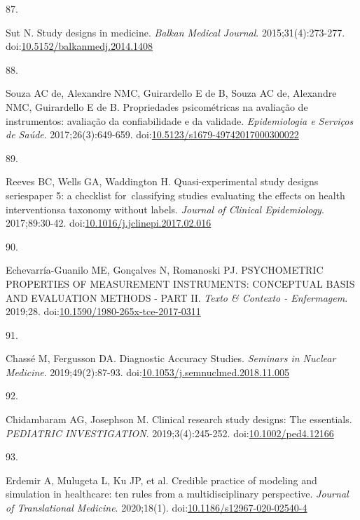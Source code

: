 \documentclass[
]{book}
\newlength{\cslhangindent}
\newlength{\csllabelwidth}
\newlength{\cslentryspacingunit} %
\newenvironment{CSLReferences}[2] %
 {%
  \setlength{\parindent}{0pt}
  \ifodd #1
  \let\oldpar\par
  \def\par{\hangindent=\cslhangindent\oldpar}
  \fi
  \setlength{\parskip}{#2\cslentryspacingunit}
 }%
 {}
\newcommand{\CSLLeftMargin}[1]{\parbox[t]{\csllabelwidth}{#1}}
\newcommand{\CSLRightInline}[1]{\parbox[t]{\linewidth - \csllabelwidth}{#1}\break}
\begin{document}
\begin{CSLReferences}{0}{0}
\leavevmode{}%
\CSLLeftMargin{87. }%
\CSLRightInline{Sut N. Study designs in medicine. \emph{Balkan Medical Journal}. 2015;31(4):273-277. doi:\href{https://doi.org/10.5152/balkanmedj.2014.1408}{10.5152/balkanmedj.2014.1408}}

\leavevmode{}%
\CSLLeftMargin{88. }%
\CSLRightInline{Souza AC de, Alexandre NMC, Guirardello E de B, Souza AC de, Alexandre NMC, Guirardello E de B. Propriedades psicométricas na avaliação de instrumentos: avaliação da confiabilidade e da validade. \emph{Epidemiologia e Serviços de Saúde}. 2017;26(3):649-659. doi:\href{https://doi.org/10.5123/s1679-49742017000300022}{10.5123/s1679-49742017000300022}}

\leavevmode{}%
\CSLLeftMargin{89. }%
\CSLRightInline{Reeves BC, Wells GA, Waddington H. Quasi-experimental study designs series{\textemdash}paper 5: a checklist for~classifying studies evaluating the effects on health interventions{\textemdash}a taxonomy without labels. \emph{Journal of Clinical Epidemiology}. 2017;89:30-42. doi:\href{https://doi.org/10.1016/j.jclinepi.2017.02.016}{10.1016/j.jclinepi.2017.02.016}}

\leavevmode{}%
\CSLLeftMargin{90. }%
\CSLRightInline{Echevarría-Guanilo ME, Gonçalves N, Romanoski PJ. PSYCHOMETRIC PROPERTIES OF MEASUREMENT INSTRUMENTS: CONCEPTUAL BASIS AND EVALUATION METHODS - PART II. \emph{Texto \& Contexto - Enfermagem}. 2019;28. doi:\href{https://doi.org/10.1590/1980-265x-tce-2017-0311}{10.1590/1980-265x-tce-2017-0311}}

\leavevmode{}%
\CSLLeftMargin{91. }%
\CSLRightInline{Chassé M, Fergusson DA. Diagnostic Accuracy Studies. \emph{Seminars in Nuclear Medicine}. 2019;49(2):87-93. doi:\href{https://doi.org/10.1053/j.semnuclmed.2018.11.005}{10.1053/j.semnuclmed.2018.11.005}}

\leavevmode{}%
\CSLLeftMargin{92. }%
\CSLRightInline{Chidambaram AG, Josephson M. Clinical research study designs: The essentials. \emph{PEDIATRIC INVESTIGATION}. 2019;3(4):245-252. doi:\href{https://doi.org/10.1002/ped4.12166}{10.1002/ped4.12166}}

\leavevmode{}%
\CSLLeftMargin{93. }%
\CSLRightInline{Erdemir A, Mulugeta L, Ku JP, et al. Credible practice of modeling and simulation in healthcare: ten rules from a multidisciplinary perspective. \emph{Journal of Translational Medicine}. 2020;18(1). doi:\href{https://doi.org/10.1186/s12967-020-02540-4}{10.1186/s12967-020-02540-4}}


\end{CSLReferences}
\end{document}
